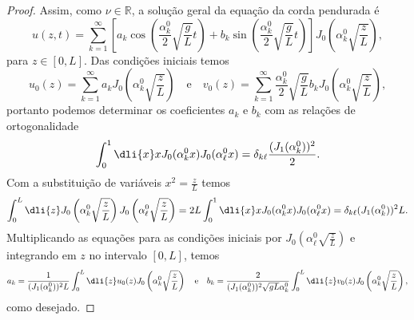 \begin{proof}
    Assim, como \(\nu \in \mathbb{R}\), a solução geral da equação da corda pendurada é
    \begin{equation*}
        u(z, t) = \sum_{k = 1}^\infty \left[a_k \cos\left(\frac{\alpha_k^0}{2}\sqrt{\frac{g}{L}}t\right)+b_k \sin\left(\frac{\alpha_k^0}{2}\sqrt{\frac{g}{L}}t\right)\right] J_0\left(\alpha_k^0 \sqrt{\frac{z}{L}}\right),
    \end{equation*}
    para \(z \in [0, L]\). Das condições iniciais temos
    \begin{equation*}
        u_0(z) = \sum_{k = 1}^{\infty} a_k J_0\left(\alpha_k^0\sqrt{\frac{z}{L}}\right)\quad\text{e}\quad v_0(z) = \sum_{k = 1}^\infty \frac{\alpha_k^0}{2}\sqrt{\frac{g}{L}}b_k J_0\left(\alpha_k^0\sqrt{\frac{z}{L}}\right),
    \end{equation*}
    portanto podemos determinar os coeficientes \(a_k\) e \(b_k\) com as relações de ortogonalidade
    \begin{equation*}
        \int_0^1 \dli{x} x J_0(\alpha_k^0 x) J_0(\alpha_\ell^0 x) = \delta_{k\ell}\frac{(J_1(\alpha_k^0))^2}{2}.
    \end{equation*}
    Com a substituição de variáveis \(x^2 = \frac{z}{L}\) temos
    \begin{equation*}
        \int_0^L \dli{z} J_0\left(\alpha_k^0 \sqrt{\frac{z}{L}}\right) J_0 \left(\alpha_\ell^0 \sqrt{\frac{z}{L}}\right) = 2L \int_0^1 \dli{x} x J_0(\alpha_k^0 x) J_0(\alpha_\ell^0 x) = \delta_{k\ell} (J_1(\alpha_k^0))^2 L.
    \end{equation*}
    Multiplicando as equações para as condições iniciais por \(J_0\left(\alpha_\ell^0 \sqrt{\frac{z}{L}}\right)\) e integrando em \(z\) no intervalo \([0,L]\), temos
    \begin{equation*}
        a_k = \frac{1}{(J_1(\alpha_k^0))^2L} \int_0^L \dli{z} u_0(z) J_0\left(\alpha_k^0\sqrt{\frac{z}{L}}\right)\quad\text{e}\quad
        b_k = \frac{2}{(J_1(\alpha_k^0))^2\sqrt{gL} \alpha_k^0} \int_0^L \dli{z} v_0(z) J_0\left(\alpha_k^0\sqrt{\frac{z}{L}}\right),
    \end{equation*}
    como desejado.
\end{proof}

